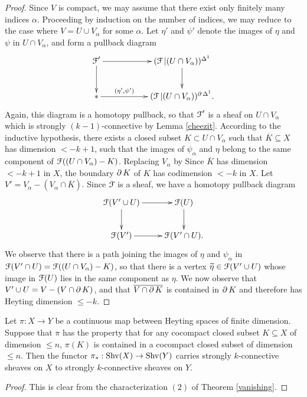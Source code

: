 \begin{proof}
Since $V$ is compact, we may assume that there exist only finitely
many indices $\alpha$. Proceeding by induction on the number of
indices, we may reduce to the case where $V = U \cup V_{\alpha}$ for some $\alpha$. 
Let $\eta'$ and $\psi'$ denote the images of $\eta$ and $\psi$ in $U \cap V_{\alpha}$,
and form a pullback
diagram $$ \xymatrix{ \calF' \ar[rr] \ar[d] & & (\calF|(U \cap V_{\alpha}))^{\Delta^1} \ar[d] \\
\ast \ar[rr]^-{(\eta', \psi')} & & (\calF|(U \cap V_{\alpha}))^{\bd \Delta^1}.}$$
Again, this diagram is a homotopy pullback, so that $\operatorname{\mathcal{F}}'$ is a sheaf on
$U \cap V_{\alpha}$ which is strongly $(k-1)$-connective by Lemma \ref{cheezit}.
According to the inductive hypothesis, there exists a closed subset 
$K \subset U \cap V_{\alpha}$ such that $\overline{K} \subseteq X$ has dimension
$< -k+1$, such that the images of $\psi_{\alpha}$ and $\eta$ belong to the same
component of $\operatorname{\mathcal{F}}( (U \cap V_{\alpha}) - K )$. Replacing $V_{\alpha}$ by
Since $\overline{K}$ has dimension $< -k+1$ in $X$, the
boundary $\operatorname{\partial} K$ of $K$ has codimension $< -k$ in $X$. Let $V' =
V_{\alpha} - (V_{\alpha} \cap \overline{K})$. Since $\operatorname{\mathcal{F}}$ is a sheaf, we have a 
homotopy pullback diagram
$$ \xymatrix{ \calF( V' \cup U) \ar[r] \ar[d] & \calF(U) \ar[d] \\
\calF(V') \ar[r] & \calF( V' \cap U ). }$$
We observe that there is a path joining the images of $\eta$ and
$\psi_{\alpha}$ in $\operatorname{\mathcal{F}}(V' \cap U) = \operatorname{\mathcal{F}}( (U \cap V_{\alpha}) - K)$, so that there
is a vertex $\widetilde{\eta} \in \operatorname{\mathcal{F}}(V' \cup U)$ whose image in $\operatorname{\mathcal{F}}(U)$ lies
in the same component as $\eta$. We now observe that $V' \cup U = V - (V \cap \operatorname{\partial} K)$,
and that $\overline{ V \cap \operatorname{\partial} K }$ is contained in $\operatorname{\partial} K$ and therefore has Heyting dimension
$\leq -k$.
\end{proof}

\begin{corollary}\label{hphp}
Let $\pi: X \rightarrow Y$ be a continuous map between Heyting
spaces of finite dimension. Suppose that $\pi$ has the property
that for any cocompact closed subset $K \subseteq X$ of dimension
$\leq n$, $\pi(K)$ is contained in a cocompact closed subset of
dimension $\leq n$. Then the functor $\pi_{\ast}: \operatorname{Shv}(X) \rightarrow \operatorname{Shv}(Y)$ 
carries strongly $k$-connective sheaves on $X$ to strongly $k$-connective sheaves on $Y$.
\end{corollary}

\begin{proof}
This is clear from the characterization $(2)$ of Theorem
\ref{vanishing}.
\end{proof}

